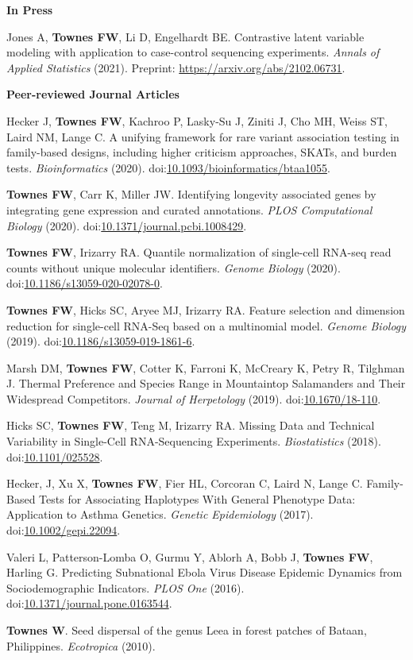 \documentclass[10pt]{article}
\newcommand\doilink[1]{\href{https://dx.doi.org/#1}{#1}}
\newcommand\doi[1]{doi:\doilink{#1}}
\newcommand\arxiv[1]{\url{https://arxiv.org/abs/#1}}
\begin{document}

\textbf{In Press}
\begin{enumerate}[label= {[\arabic*]}]
\item Jones A, {\bf Townes FW}, Li D, Engelhardt BE. Contrastive latent variable modeling with application to case-control sequencing experiments. {\it Annals of Applied Statistics} (2021). \newline Preprint: \arxiv{2102.06731}.
\end{enumerate}

\textbf{Peer-reviewed Journal Articles}
\begin{enumerate}[label= {[\arabic*]}]
\item Hecker J, {\bf Townes FW}, Kachroo P, Lasky-Su J, Ziniti J, Cho MH, Weiss ST, Laird NM, Lange C. A unifying framework for rare variant association testing in family-based designs, including higher criticism approaches, SKATs, and burden tests. {\it Bioinformatics} (2020). \newline \doi{10.1093/bioinformatics/btaa1055}.
\item {\bf Townes FW}, Carr K, Miller JW. Identifying longevity associated genes by integrating gene expression and curated annotations. {\it PLOS Computational Biology} (2020). \newline \doi{10.1371/journal.pcbi.1008429}.
\item {\bf Townes FW}, Irizarry RA. Quantile normalization of single-cell RNA-seq read counts without unique molecular identifiers. {\it Genome Biology} (2020). \doi{10.1186/s13059-020-02078-0}.
\item {\bf Townes FW}, Hicks SC, Aryee MJ, Irizarry RA. Feature selection and dimension reduction for single-cell RNA-Seq based on a multinomial model. {\it Genome Biology} (2019). \doi{10.1186/s13059-019-1861-6}.
\item Marsh DM, {\bf Townes FW}, Cotter K, Farroni K, McCreary K, Petry R, Tilghman J. Thermal Preference and Species Range in Mountaintop Salamanders and Their Widespread Competitors. {\it Journal of Herpetology} (2019). \doi{10.1670/18-110}.
\item Hicks SC, {\bf Townes FW}, Teng M, Irizarry RA. Missing Data and Technical Variability in Single-Cell RNA-Sequencing Experiments. {\it Biostatistics} (2018). \doi{10.1101/025528}.
\item Hecker, J, Xu X, {\bf Townes FW}, Fier HL, Corcoran C, Laird N, Lange C. Family-Based Tests for Associating Haplotypes With General Phenotype Data: Application to Asthma Genetics. {\it Genetic Epidemiology} (2017). \doi{10.1002/gepi.22094}.
\item Valeri L, Patterson-Lomba O, Gurmu Y, Ablorh A, Bobb J, {\bf Townes FW}, Harling G. Predicting Subnational Ebola Virus Disease Epidemic Dynamics from Sociodemographic Indicators. {\it PLOS One} (2016). \doi{10.1371/journal.pone.0163544}.
\item {\bf Townes W}. Seed dispersal of the genus Leea in forest patches of Bataan, Philippines. {\it Ecotropica } (2010).
\end{enumerate}
\end{document}
